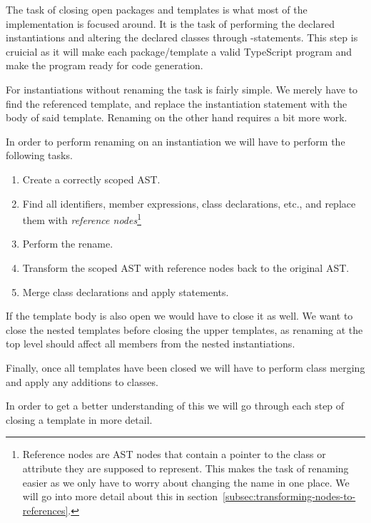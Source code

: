 The task of closing open packages and templates is what most of the implementation is focused around.
It is the task of performing the declared instantiations and altering the declared classes through -statements.
This step is cruicial as it will make each package/template a valid TypeScript program and make the program ready for code generation.

For instantiations without renaming the task is fairly simple.
We merely have to find the referenced template, and replace the instantiation statement with the body of said template.
Renaming on the other hand requires a bit more work.

In order to perform renaming on an instantiation we will have to perform the following tasks.
\begin{enumerate}
    \item Create a correctly scoped AST.
    \item Find all identifiers, member expressions, class declarations, etc., and replace them with \textit{reference nodes}\footnote{Reference nodes are AST nodes that contain a pointer to the class or attribute they are supposed to represent. This makes the task of renaming easier as we only have to worry about changing the name in one place. We will go into more detail about this in section~\vref{subsec:transforming-nodes-to-references}.}
    \item Perform the rename.
    \item Transform the scoped AST with reference nodes back to the original AST\@.
    \item Merge class declarations and apply  statements.
\end{enumerate}

If the template body is also open we would have to close it as well.
We want to close the nested templates before closing the upper templates, as renaming at the top level should affect all members from the nested instantiations.

Finally, once all templates have been closed we will have to perform class merging and apply any additions to classes.

In order to get a better understanding of this we will go through each step of closing a template in more detail.

